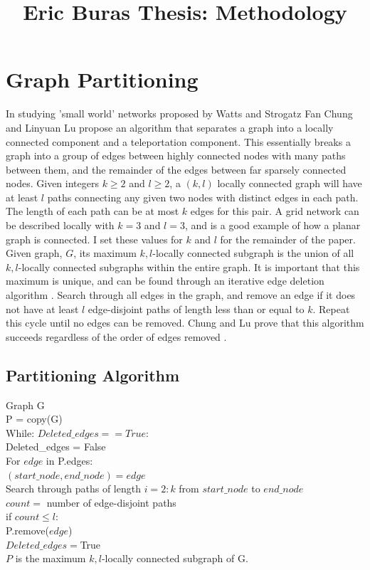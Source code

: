 \documentclass{article}
\begin{document}
\title{Eric Buras Thesis: Methodology}

\maketitle

\section{Graph Partitioning}
In studying 'small world' networks proposed by Watts and Strogatz \cite{Watts:1998} Fan Chung and Linyuan Lu propose an algorithm that separates a graph into a locally connected component and a teleportation component. This essentially breaks a graph into a group of edges between highly connected nodes with many paths between them, and the remainder of the edges between far sparsely connected nodes. Given integers $k \geq 2$ and $l \geq 2$, a $(k,l)$ locally connected graph will have at least $l$ paths connecting any given two nodes with distinct edges in each path. The length of each path can be at most $k$ edges for this pair. A grid network can be described locally with $k=3$ and $l=3$, and is a good example of how a planar graph is connected. I set these values for $k$ and $l$ for the remainder of the paper. Given graph, $G$, its maximum $k,l$-locally connected subgraph is the union of all $k,l$-locally connected subgraphs within the entire graph. It is important that this maximum is unique, and can be found through an iterative edge deletion algorithm \cite{Chung:2004}. Search through all edges in the graph, and remove an edge if it does not have at least $l$ edge-disjoint paths of length less than or equal to $k$. Repeat this cycle until no edges can be removed. Chung and Lu prove that this algorithm succeeds regardless of the order of edges removed \cite{Chung:2004}. 

\subsection{Partitioning Algorithm}
Graph G\\
P = copy(G)\\
While: $Deleted\_edges == True$:\\
\indent Deleted\_edges = False\\
\indent For $edge$ in P.edges:\\
\indent \indent $(start\_node, end\_node) = edge$\\
\indent \indent Search through paths of length $i=2:k$ from $start\_node$ to $end\_node$\\
\indent \indent $count =$  number of edge-disjoint paths\\
\indent \indent if $count \leq l$:\\
\indent \indent \indent P.remove($edge$)\\
\indent \indent \indent $Deleted\_edges = $True\\
$P$ is the maximum $k,l$-locally connected subgraph of G.
	
\end{document}
